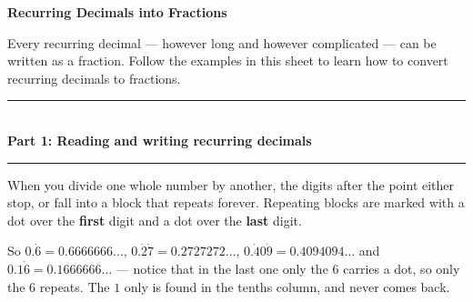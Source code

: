 \documentclass[12pt,a4paper]{article}
\newcommand{\heading}[1]{%
  \vspace{2pt}
  {\color{blue!45!black}\rule{\linewidth}{1pt}}\\[1pt]
  {\large\bfseries #1}\\[-6pt]
  {\color{blue!45!black}\rule{\linewidth}{0.4pt}}
  \vspace{2pt}}
\newcommand{\parttitle}[2]{\heading{Part #1: #2}}
\begin{document}
\begin{center}
  {\Large\bfseries Recurring Decimals into Fractions}\\[8pt]
\end{center}
\vspace{1pt}

\begin{keyidea}
\small
Every recurring decimal --- however long and however complicated --- can be written as a fraction. Follow the examples in this sheet to learn how to convert recurring decimals to fractions.
\end{keyidea}

\parttitle{1}{Reading and writing recurring decimals}

When you divide one whole number by another, the digits after the point either
stop, or fall into a block that repeats forever. Repeating blocks are marked with a dot over the \textbf{first} digit and a dot over the \textbf{last}
digit.

\begin{center}
\end{center}
\vspace{-4pt}

So $0.\dot{6}=0.6666666\ldots$, \; $0.\dot{2}\dot{7}=0.2727272\ldots$, \;
$0.\dot{4}0\dot{9}=0.4094094\ldots$ \; and $0.1\dot{6}=0.1666666\ldots$ ---
notice that in the last one only the $6$ carries a dot, so only the $6$
repeats. The $1$ only is found in the tenths column, and never comes back.

\vspace{2em}
\end{document}
